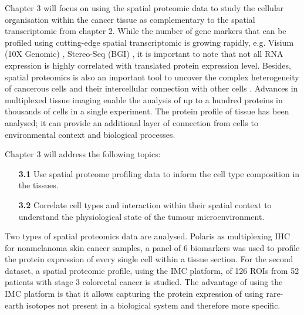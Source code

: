 Chapter 3 will focus on using the spatial proteomic data to study the cellular organisation within the cancer tissue as complementary to the spatial transcriptomic from chapter 2. While the number of gene markers that can be profiled using cutting-edge spatial transcriptomic is growing rapidly, e.g. Visium (10X Genomic) \cite{thrane2018spatially, moncada2019integrating,ji2020multimodal},  Stereo-Seq (BGI) \cite{wei2022single,chen2022spatiotemporal}, it is important to note that not all RNA expression is highly correlated with translated protein expression level. Besides, spatial proteomics is also an important tool to uncover the complex heterogeneity of cancerous cells and their intercellular connection with other cells \cite{arnol2019modeling, jackson2020single, bodenmiller2016multiplexed}. Advances in multiplexed tissue imaging enable the analysis of up to a hundred proteins in thousands of cells in a single experiment. The protein profile of tissue has been analysed; it can provide an additional layer of connection from cells to environmental context and biological processes. 

Chapter 3 will address the following topics:    
\begin{enumerate}[align=left]
    \item[\textbf{3.1}] Use spatial proteome profiling data to inform the cell type composition in the tissues.
    \item[\textbf{3.2}] Correlate cell types and interaction within their spatial context to understand the physiological state of the tumour microenvironment.
\end{enumerate}

Two types of spatial proteomics data are analysed. Polaris as multiplexing IHC for nonmelanoma skin cancer samples, a panel of 6 biomarkers was used to profile the protein expression of every single cell within a tissue section. For the second dataset, a spatial proteomic profile, using the IMC platform, of 126 ROIs from 52 patients with stage 3 colorectal cancer is studied. The advantage of using the IMC platform is that it allows capturing the protein expression of using rare-earth isotopes not present in a biological system and therefore more specific. 


